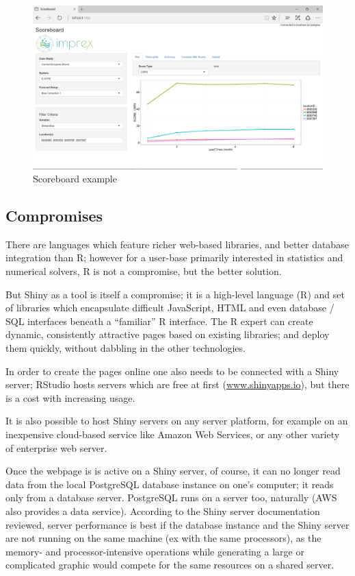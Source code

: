 \documentclass[logos,parttoc,morelanguage=french,morelanguage=german]{orsay-memoire}
\begin{document}
\begin{figure}[ht]
\centering
\includegraphics[width=\linewidth]{images/shinPlotCRPS.png}
  \caption{Scoreboard example}
  \label{fig:scoreboard example}
\end{figure}

\subsection{Compromises}
There are languages which feature richer web-based libraries, and better database integration than R; however for a user-base primarily interested in statistics and numerical solvers, R is not a compromise, but the better solution.

But Shiny as a tool is itself a compromise; it is a high-level language (R) and set of libraries which encapsulate difficult JavaScript, HTML and even database / SQL interfaces beneath a ``familiar'' R interface. The R expert can create dynamic, consistently attractive pages based on existing libraries; and deploy them quickly, without dabbling in the other technologies.

In order to create the pages online one also needs to be connected with a Shiny server; RStudio hosts servers which are free at first (\href{https://www.shinyapps.io/}{www.shinyapps.io}), but there is a cost with increasing usage.

It is also possible to host Shiny servers on any server platform, for example on an inexpensive cloud-based service like Amazon Web Services, or any other variety of enterprise web server.

Once the webpage is is active on a Shiny server, of course, it can no longer read data from the local PostgreSQL database instance on one's computer; it reads only from a database server. PostgreSQL runs on a server too, naturally (AWS also provides a data service). According to the Shiny server documentation reviewed, server performance is best if the database instance and the Shiny server are not running on the same machine (ex with the same processors), as the memory- and processor-intensive operations while generating a large or complicated graphic would compete for the same resources on a shared server.
\end{document}
